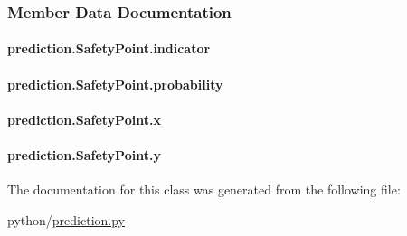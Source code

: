 \subsubsection{Member Data Documentation}
\hypertarget{classprediction_1_1SafetyPoint_a21037e5e96b53e0e62ce35ee78736588}{
\paragraph[{indicator}]{\setlength{\rightskip}{0pt plus 5cm}prediction.\-Safety\-Point.\-indicator}}\label{classprediction_1_1SafetyPoint_a21037e5e96b53e0e62ce35ee78736588}
\hypertarget{classprediction_1_1SafetyPoint_a8c892e8a7553d30e03ff0e69e6278a84}{
\paragraph[{probability}]{\setlength{\rightskip}{0pt plus 5cm}prediction.\-Safety\-Point.\-probability}}\label{classprediction_1_1SafetyPoint_a8c892e8a7553d30e03ff0e69e6278a84}
\hypertarget{classprediction_1_1SafetyPoint_a9f202108705b2d9fd4109cbd7744f135}{
\paragraph[{x}]{\setlength{\rightskip}{0pt plus 5cm}prediction.\-Safety\-Point.\-x}}\label{classprediction_1_1SafetyPoint_a9f202108705b2d9fd4109cbd7744f135}
\hypertarget{classprediction_1_1SafetyPoint_a3145aaa84593c68833ca3c1552714e5c}{
\paragraph[{y}]{\setlength{\rightskip}{0pt plus 5cm}prediction.\-Safety\-Point.\-y}}\label{classprediction_1_1SafetyPoint_a3145aaa84593c68833ca3c1552714e5c}


The documentation for this class was generated from the following file\-:\begin{DoxyCompactItemize}
\item 
python/\hyperlink{prediction_8py}{prediction.\-py}\end{DoxyCompactItemize}
